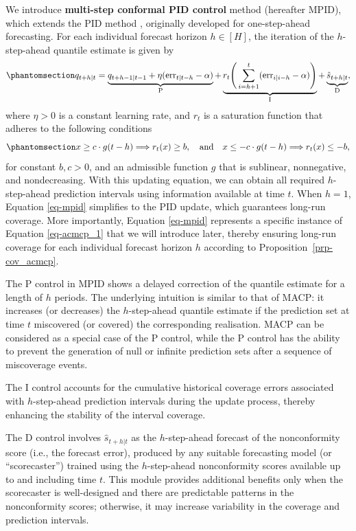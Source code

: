 \documentclass[
  11pt,
  12pt]{article}
\theoremstyle{plain}
\theoremstyle{remark}
\begin{document}
We introduce \textbf{multi-step conformal PID control} method (hereafter
MPID), which extends the PID method \citep{angelopoulos2024}, originally
developed for one-step-ahead forecasting. For each individual forecast
horizon \(h\in[H]\), the iteration of the \(h\)-step-ahead quantile
estimate is given by \begin{equation}\phantomsection\label{eq-mpid}{
q_{t+h|t}=\underbrace{q_{t+h-1|t-1}+\eta (\mathrm{err}_{t|t-h}-\alpha)}_{\mathrm{P}}+\underbrace{r_t\Bigg(\sum_{i=h+1}^t (\mathrm{err}_{i|i-h}-\alpha)\Bigg)}_{\mathrm{I}}+\underbrace{\hat{s}_{t+h|t}}_{\mathrm{D}},
}\end{equation} where \(\eta > 0\) is a constant learning rate, and
\(r_t\) is a saturation function that adheres to the following
conditions\pagebreak[1]\begin{equation}\phantomsection\label{eq-saturation_h}{
x \geq c \cdot g(t-h) \Longrightarrow r_t(x) \geq b, \quad \text {and} \quad x \leq-c \cdot g(t-h) \Longrightarrow r_t(x) \leq -b,
}\end{equation} for constant \(b, c > 0\), and an admissible function
\(g\) that is sublinear, nonnegative, and nondecreasing. With this
updating equation, we can obtain all required \(h\)-step-ahead
prediction intervals using information available at time \(t\). When
\(h=1\), Equation \eqref{eq-mpid} simplifies to the PID update, which
guarantees long-run coverage. More importantly, Equation \eqref{eq-mpid}
represents a specific instance of Equation \eqref{eq-acmcp_1} that we
will introduce later, thereby ensuring long-run coverage for each
individual forecast horizon \(h\) according to
Proposition~\ref{prp-cov_acmcp}.

The P control in MPID shows a delayed correction of the quantile
estimate for a length of \(h\) periods. The underlying intuition is
similar to that of MACP: it increases (or decreases) the
\(h\)-step-ahead quantile estimate if the prediction set at time \(t\)
miscovered (or covered) the corresponding realisation. MACP can be
considered as a special case of the P control, while the P control has
the ability to prevent the generation of null or infinite prediction
sets after a sequence of miscoverage events.

The I control accounts for the cumulative historical coverage errors
associated with \(h\)-step-ahead prediction intervals during the update
process, thereby enhancing the stability of the interval coverage.

The D control involves \(\hat{s}_{t+h|t}\) as the \(h\)-step-ahead
forecast of the nonconformity score (i.e., the forecast error), produced
by any suitable forecasting model (or ``scorecaster'') trained using the
\(h\)-step-ahead nonconformity scores available up to and including time
\(t\). This module provides additional benefits only when the
scorecaster is well-designed and there are predictable patterns in the
nonconformity scores; otherwise, it may increase variability in the
coverage and prediction intervals.
\end{document}
